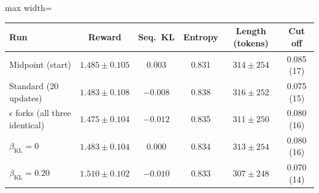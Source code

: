 \begin{adjustbox}{max width=\linewidth}
\begin{tabular}{lccccc}
\toprule
Run & Reward & Seq.\ KL & Entropy & Length (tokens) & Cut off \\
\midrule
Midpoint (start) & $1.485 \pm 0.105$ & 0.003 & 0.831 & $314 \pm 254$ & 0.085 (17) \\
Standard (20 updates) & $1.483 \pm 0.108$ & $-0.008$ & 0.838 & $316 \pm 252$ & 0.075 (15) \\
$\epsilon$ forks (all three identical) & $1.475 \pm 0.104$ & $-0.012$ & 0.835 & $311 \pm 250$ & 0.080 (16) \\
$\beta_{\mathrm{KL}} = 0$ & $1.483 \pm 0.104$ & 0.000 & 0.834 & $313 \pm 254$ & 0.080 (16) \\
$\beta_{\mathrm{KL}} = 0.20$ & $1.510 \pm 0.102$ & $-0.010$ & 0.833 & $307 \pm 248$ & 0.070 (14) \\
\bottomrule
\end{tabular}
\end{adjustbox}
